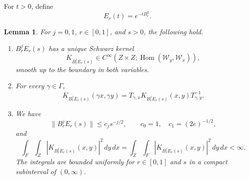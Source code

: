 \documentclass[12pt,reqno]{amsart}
\numberwithin{equation}{section}
\newtheorem{lemma}[theorem]{Lemma}
\theoremstyle{definition}
\newcommand{\cW}{\mathscr W}
\begin{document}
For $t>0$, define
\[
 E_r(t)=e^{-tB_r^2}.
\]

\begin{lemma}\label{lem:heat-kernel}
For $j=0,1$, $r\in[0,1]$, and $s>0$, the following hold.
\begin{enumerate}[label=\textup{(\roman*)},leftmargin=2.8em]
\item\label{heat:smooth}
 $B_r^jE_r(s)$ has a unique Schwarz kernel
\[
 K_{B_r^jE_r(s)}\in
 C^\infty\!\left(Z\times Z;
 \operatorname{Hom}(\cW_y,\cW_x)\right),
\]
smooth up to the boundary in both variables.
\item\label{heat:deck}
For every $\gamma\in\Gamma$,
\begin{equation}\label{eq:heat-kernel-under-gamma}
 K_{B_r^jE_r(s)}(\gamma x,\gamma y)
 =T_{\gamma,x}K_{B_r^jE_r(s)}(x,y)T_{\gamma,y}^{-1}.
\end{equation}
\item\label{heat:L2}
We have
\begin{equation}\label{eq:heat-operator-bound}
 \|B_r^jE_r(s)\|\leq c_js^{-j/2},
 \qquad c_0=1,\quad c_1=(2e)^{-1/2},
\end{equation}
and
\begin{equation}\label{eq:heat-square-integrals}
 \int_F\!\int_Z|K_{B_r^jE_r(s)}(x,y)|^2\,dy\,dx
 =\int_Z\!\int_F|K_{B_r^jE_r(s)}(x,y)|^2\,dy\,dx<\infty.
\end{equation}
The integrals are bounded uniformly for $r\in[0,1]$ and $s$ in a
compact subinterval of $(0,\infty)$.
\end{enumerate}
\end{lemma}
\end{document}
